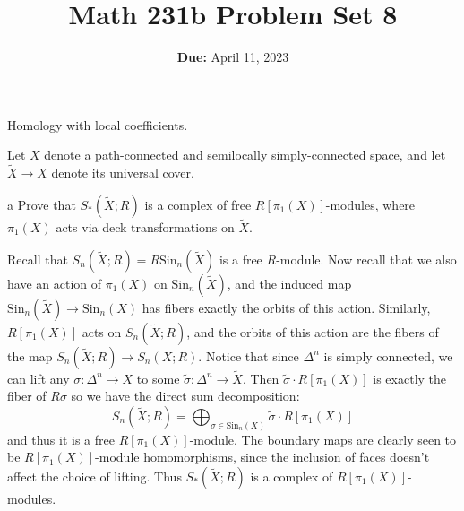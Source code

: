 \documentclass[11pt,letterpaper]{article}
\title{\textbf{Math 231b Problem Set 8}}
\date{\textbf{Due:} April 11, 2023}
\begin{document}
\maketitle

\begin{problem}
    Homology with local coefficients.
\end{problem}

\begin{solution}
    Let $X$ denote a path-connected and semilocally simply-connected space, and let $\widetilde{X} \to X$ denote its universal cover.
    \begin{partproblem}{a}
        Prove that $S_*(\widetilde{X}; R)$ is a complex of free $R[\pi_1(X)]$-modules, where $\pi_1(X)$ acts via deck transformations on $\widetilde{X}$. %
    \end{partproblem}

    \quad Recall that $S_n(\widetilde{X}; R) = R\textrm{Sin}_n(\widetilde{X})$ is a free $R$-module. Now recall that we also have an action of $\pi_1(X)$ on $\textrm{Sin}_n(\widetilde{X})$, and the induced map $\textrm{Sin}_n(\widetilde{X}) \to \textrm{Sin}_n(X)$ has fibers exactly the orbits of this action. Similarly, $R[\pi_1(X)]$ acts on $S_n(\widetilde{X}; R)$, and the orbits of this action are the fibers of the map $S_n(\widetilde{X}; R) \to S_n(X; R)$. Notice that since $\Delta^n$ is simply connected, we can lift any $\sigma : \Delta^n \to X$ to some $\widetilde{\sigma} : \Delta^n \to \widetilde{X}$. Then $\widetilde{\sigma}\cdot R[\pi_1(X)]$ is exactly the fiber of $R\sigma$ so we have the direct sum decomposition:
    \[
        S_n(\widetilde{X}; R) = \bigoplus_{\sigma \in \textrm{Sin}_n(X)} \widetilde{\sigma}\cdot R[\pi_1(X)]
    \]
    and thus it is a free $R[\pi_1(X)]$-module. The boundary maps are clearly seen to be $R[\pi_1(X)]$-module homomorphisms, since the inclusion of faces doesn't affect the choice of lifting. Thus $S_*(\widetilde{X}; R)$ is a complex of $R[\pi_1(X)]$-modules.


\end{solution}
\end{document}
